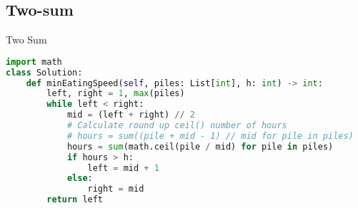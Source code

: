\documentclass[a4paper,12pt]{article}
\begin{document}
\begin{multicols}{2}
\columnbreak

\subsection{Two-sum}

\begin{mycode}[label={lst:two-sum}]{Two Sum}
\begin{lstlisting}[language=Python]
import math
class Solution:
    def minEatingSpeed(self, piles: List[int], h: int) -> int:
        left, right = 1, max(piles)
        while left < right:
            mid = (left + right) // 2
            # Calculate round up ceil() number of hours
            # hours = sum((pile + mid - 1) // mid for pile in piles)
            hours = sum(math.ceil(pile / mid) for pile in piles)
            if hours > h:
                left = mid + 1
            else:
                right = mid
        return left
\end{lstlisting}
\end{mycode}


\end{multicols}
\end{document}
